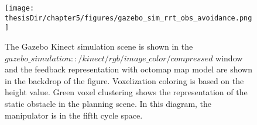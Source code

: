 \begin{figure}
  \centering
  \captionsetup{justification=centering}
  \texttt{[image: \\thesisDir/chapter5/figures/gazebo\_sim\_rrt\_obs\_avoidance.png]}
  \caption{The Gazebo Kinect simulation scene is shown
            in the 
            $gazebo\_simulation::/kinect/rgb/image\_color/compressed$ window
            and the feedback representation with octomap map model
            are shown in the backdrop of the figure. Voxelization coloring
            is based on the height value. Green voxel clustering shows 
            the representation of the static obstacle in the planning scene.
            In this diagram, the manipulator is in the fifth cycle space.}
  \label{fig:gazebo_sim_rrt_obs_avoidance}
\end{figure}

